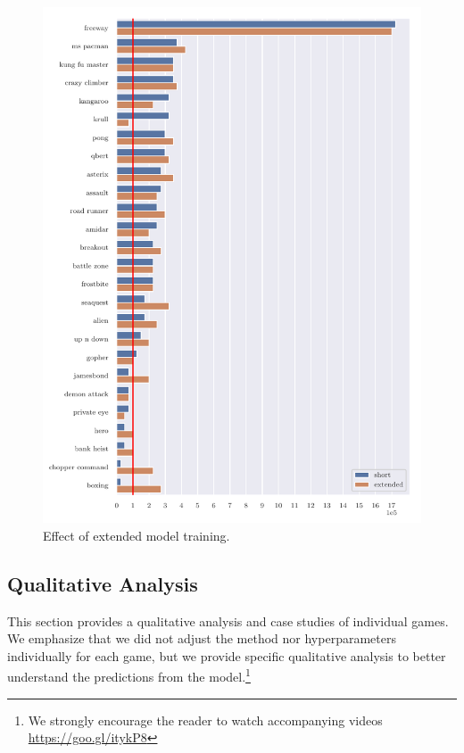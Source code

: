 \begin{figure}
\centering
\includegraphics[width=0.9\columnwidth]{figures/graph_Effect_of_extended_model_training.pdf}
\caption{Effect of extended model training.}
\label{fig:comp_long_train}
\end{figure}


\subsection{Qualitative Analysis}\label{qualitative_analysis}
This section provides a qualitative analysis and case studies of individual games. We emphasize that we did not adjust the method nor hyperparameters individually for each game, but we provide specific qualitative analysis to better understand the predictions from the model.\footnote{We strongly encourage the reader to watch accompanying videos \url{https://goo.gl/itykP8}} 

